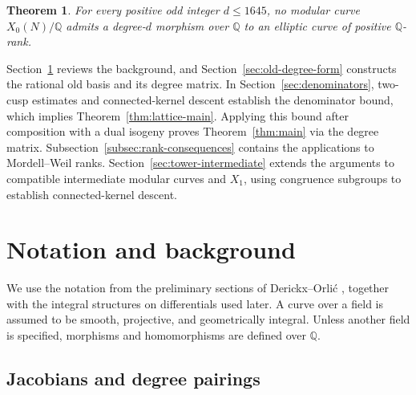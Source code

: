 \documentclass[12pt, letterpaper]{amsart}
\newtheorem{theorem}{Theorem}[section]
\theoremstyle{definition}
\theoremstyle{remark}
\newcommand{\Q}{\mathbb Q}
\numberwithin{equation}{section}
\begin{document}
\begin{theorem}\label{thm:intro-rank-applications}
For every positive odd integer \(d\leq1645\), no modular curve
\(X_0(N)/\Q\) admits a degree-\(d\) morphism over \(\Q\) to an elliptic curve
of positive \(\Q\)-rank.
\end{theorem}

Section~\ref{sec:DO-setup} reviews the background, and
Section~\ref{sec:old-degree-form} constructs the rational old basis and its
degree matrix. In Section~\ref{sec:denominators}, two-cusp estimates and
connected-kernel descent establish the denominator bound, which implies
Theorem~\ref{thm:lattice-main}. Applying this bound after composition with a
dual isogeny proves Theorem~\ref{thm:main} via the degree matrix.
Subsection~\ref{subsec:rank-consequences} contains the applications to
Mordell--Weil ranks. Section~\ref{sec:tower-intermediate} extends the arguments
to compatible intermediate modular curves and \(X_1\), using congruence
subgroups to establish connected-kernel descent.

\section{Notation and background}\label{sec:DO-setup}
We use the notation from the preliminary sections of
Derickx--Orli\'c \cite{DerickxOrlic}, together with the
integral structures on differentials used later. A curve over a field is assumed to
be smooth, projective, and geometrically integral. Unless another field is
specified, morphisms and homomorphisms are defined over \(\Q\).

\subsection{Jacobians and degree pairings}
\end{document}
